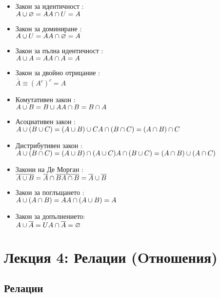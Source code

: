 \documentclass[fleqn, 12pt]{article}
\begin{document}
\begin{itemize}
	\item Закон за идентичност : \\
$A \cup \varnothing = A \\
 A \cap U = A$
	\item Закон за доминиране :  \\
$A \cup U = A \\
 A \cap \varnothing = A$
	\item Закон за пълна идентичност : \\
$A \cup A = A \\
 A \cap A = A$
	\item Закон за двойно отрицание : \\
$\overline{\overline{A}} \equiv (A^c)^c  = A$
	\item Комутативен закон :\\ 
$A \cup B = B \cup A \\ 
A \cap B = B \cap A $
	\item Асоциативен закон :\\ 
$A \cup (B \cup C) = (A \cup B) \cup C \\ 
A \cap (B \cap C) = (A \cap B) \cap C $
	\item Дистрибутивен закон : \\
$A \cup (B \cap C) = (A \cup B) \cap (A \cup C) \\
 A \cap (B \cup C) = (A \cap B) \cup (A \cap C) $
	\item Закони на Де Морган : \\
$\overline{A \cup B} = \overline{A} \cap \overline{B} \\
\overline{A \cap B} = \overline{A} \cup \overline{B}$
	\item Закон за поглъщането : \\
$A \cup (A \cap B) = A \\
 A \cap (A \cup B) = A $
	\item Закон за допълнението: \\
$A \cup \overline{A} = U \\
 A \cap \overline{A} = \varnothing $  
\end{itemize}

\newpage 

\section{Лекция 4: Релации (Oтношения)}

\subsection{Релации}
\end{document}
